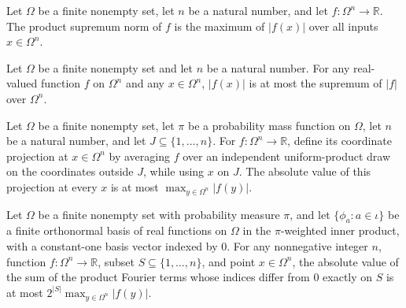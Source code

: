 \begin{definition}
\label{FABL.productSupNorm}
\leanok
{}
Let $\Omega$ be a finite nonempty set, let $n$ be a natural number, and let
$f\colon\Omega^n\to\mathbb R$. The product supremum norm of $f$ is the maximum of
$|f(x)|$ over all inputs $x\in\Omega^n$.
\end{definition}

\begin{theorem}
\label{FABL.abs_le_productSupNorm}
\leanok
{}
Let $\Omega$ be a finite nonempty set and let $n$ be a natural number. For any
real-valued function $f$ on $\Omega^n$ and any $x\in\Omega^n$, $|f(x)|$ is at most
the supremum of $|f|$ over $\Omega^n$.
\end{theorem}

\begin{theorem}
\label{FABL.abs_projectOnCoordinates_le_productSupNorm}
\leanok
{}
Let $\Omega$ be a finite nonempty set, let $\pi$ be a probability mass function on
$\Omega$, let $n$ be a natural number, and let $J\subseteq\{1,\ldots,n\}$. For
$f:\Omega^n\to\mathbb R$, define its coordinate projection at $x\in\Omega^n$ by
averaging $f$ over an independent uniform-product draw on the coordinates outside $J$,
while using $x$ on $J$. The absolute value of this projection at every $x$ is at most
$\max_{y\in\Omega^n}|f(y)|$.
\end{theorem}

\begin{theorem}
\label{FABL.FiniteFourierBasis.abs_orthogonalComponent_le}
\leanok
{}
Let $\Omega$ be a finite nonempty set with probability measure $\pi$, and let
$\{\phi_a:a\in\iota\}$ be a finite orthonormal basis of real functions on $\Omega$ in
the $\pi$-weighted inner product, with a constant-one basis vector indexed by $0$. For
any nonnegative integer $n$, function $f:\Omega^n\to\mathbb R$, subset
$S\subseteq\{1,\ldots,n\}$, and point $x\in\Omega^n$, the absolute value of the sum of
the product Fourier terms whose indices differ from $0$ exactly on $S$ is at most
$2^{|S|}\max_{y\in\Omega^n}|f(y)|$.
\end{theorem}

